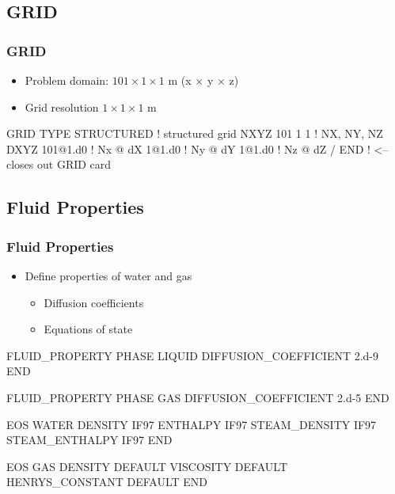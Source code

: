 \documentclass{beamer}
\newcommand\bluecomment[1]{{{\color{blue} #1}}}
\begin{document}
\subsection{GRID}
\begin{frame}\frametitle{GRID}

\begin{itemize}
  \item Problem domain: $101 \times 1 \times 1$ m (x $\times$ y $\times$ z)
  \item Grid resolution $1 \times 1 \times 1$ m
\end{itemize}

\begin{semiverbatim}
GRID
  TYPE STRUCTURED        \bluecomment{! structured grid}
  NXYZ 101 1 1           \bluecomment{! NX, NY, NZ}
  DXYZ            
    101@1.d0   \bluecomment{! Nx @ dX}
    1@1.d0  \bluecomment{! Ny @ dY}
    1@1.d0  \bluecomment{! Nz @ dZ}
  /  
END  \bluecomment{! <-- closes out GRID card}
\end{semiverbatim}

\end{frame}

\subsection{Fluid Properties}

\begin{frame}\frametitle{Fluid Properties}

\begin{itemize}
  \item Define properties of water and gas
  \begin{itemize}
    \item Diffusion coefficients
    \item Equations of state
  \end{itemize}
\end{itemize}

\begin{semiverbatim}
FLUID_PROPERTY
  PHASE LIQUID
  DIFFUSION_COEFFICIENT 2.d-9
END

FLUID_PROPERTY
  PHASE GAS
  DIFFUSION_COEFFICIENT 2.d-5
END

\newpage

EOS WATER
  DENSITY IF97
  ENTHALPY IF97
  STEAM_DENSITY IF97
  STEAM_ENTHALPY IF97
END

EOS GAS
  DENSITY DEFAULT
  VISCOSITY DEFAULT
  HENRYS_CONSTANT DEFAULT
END

\end{semiverbatim}

\end{frame}
\end{document}

